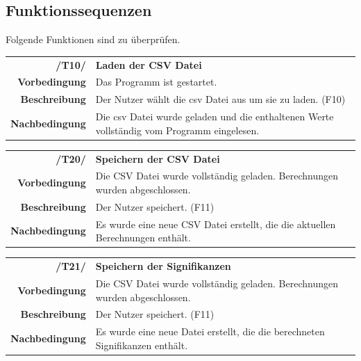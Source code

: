 \documentclass{article}
\begin{document}
\subsection{Funktionssequenzen}
Folgende Funktionen sind zu überprüfen.

\begin{table}[H]
\begin{tabularx}{\textwidth}{rX}
\textbf{/T10/}         & \textbf{Laden der CSV Datei}                                                               \\
\textbf{Vorbedingung}  & Das Programm ist gestartet.                                                                \\
\textbf{Beschreibung}  & Der Nutzer wählt die csv Datei aus um sie zu laden. (F10)                                \\
\textbf{Nachbedingung} & Die csv Datei wurde geladen und die enthaltenen Werte vollständig vom Programm eingelesen.
\end{tabularx}
\end{table}

\begin{table}[H]
\begin{tabularx}{\textwidth}{rX}
\textbf{/T20/}         & \textbf{Speichern der CSV Datei} \\
\textbf{Vorbedingung}  & Die CSV Datei wurde vollständig geladen. Berechnungen wurden abgeschlossen.   \\
\textbf{Beschreibung}  & Der Nutzer speichert. (F11)                                \\
\textbf{Nachbedingung} & Es wurde eine neue CSV Datei erstellt, die die aktuellen Berechnungen enthält.
\end{tabularx}
\end{table}

\begin{table}[H]
\begin{tabularx}{\textwidth}{rX}
\textbf{/T21/}         & \textbf{Speichern der Signifikanzen}  \\
\textbf{Vorbedingung}  & Die CSV Datei wurde vollständig geladen. Berechnungen wurden abgeschlossen.   \\
\textbf{Beschreibung}  & Der Nutzer speichert. (F11)                               \\
\textbf{Nachbedingung} & Es wurde eine neue Datei erstellt, die die berechneten Signifikanzen enthält.
\end{tabularx}
\end{table}
\end{document}
